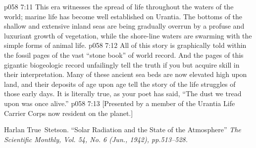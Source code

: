 \vs p058 7:11 \pc This era witnesses the spread of life throughout the waters of the world; marine life has become well established on Urantia. The bottoms of the shallow and extensive inland seas are being gradually overrun by a profuse and luxuriant growth of vegetation, while the shore\hyp{}line waters are swarming with the simple forms of animal life.
\vs p058 7:12 \pc All of this story is graphically told within the fossil pages of the vast “stone book” of world record. And the pages of this gigantic biogeologic record unfailingly tell the truth if you but acquire skill in their interpretation. Many of these ancient sea beds are now elevated high upon land, and their deposits of age upon age tell the story of the life struggles of those early days. It is literally true, as your poet has said, “The dust we tread upon was once alive.”
\vsetoff
\vs p058 7:13 [Presented by a member of the Urantia Life Carrier Corps now resident on the planet.]
\quizlink
\begin{thebibliography}{100}
Harlan True~Stetson.
{``Solar Radiation and the State of the Atmosphere''}
{\em The Scientific Monthly, Vol. 54, No. 6 (Jun., 1942), pp.513--528.}
\end{thebibliography}
